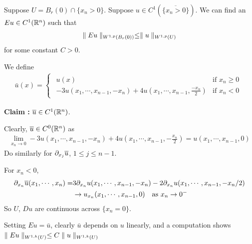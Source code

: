 \documentclass[10pt,a4paper]{report}
\newenvironment{proof}
{\begin{changemargin}{1cm}{0.5cm} 
	}%
	{\end{changemargin}
}
\newenvironment{subproof}
{\begin{changemargin}{0.5cm}{0.5cm} 
	}%
	{\end{changemargin}
}
\begin{document}
\lem Suppose $U = B_r(0) \cap \{x_n >0 \}$.  Suppose $u \in C^1( \overline{\{x_n>0 \}})$. We can find an $Eu \in C^1(\mathbb{R}^n)$ such that
\begin{align*}
\parallel Eu \parallel_{W^{1,p}(B_r(0))} \leq \parallel u \parallel_{W^{1,p}(U)}
\end{align*}
for some constant $C>0$.
\begin{proof}
\pf We define \begin{align*}
\bar{u}(x) = \begin{cases}
\begin{array}{lc}
u(x) & \text{if } x_n \geq 0 \\
-3u(x_1, \cdots, x_{n-1},-x_n) + 4u(x_1,\cdots, x_{n-1},\frac{-x_n}{2}) & \text{if } x_n<0
\end{array}
\end{cases}
\end{align*}
\begin{subproof}
\textbf{Claim :} $\overline{u} \in C^1(\mathbb{R}^n)$.

\quad Clearly, $\overline{u} \in C^0(\mathbb{R}^n)$ as
\begin{align*}
\lim_{x_n \rightarrow 0} -3u(x_1, \cdots,x_{n-1},-x_n) + 4u(x_1, \cdots, x_{n-1},-\frac{x_n}{2}) = u(x_1, \cdots, x_{n-1},0)
\end{align*}
Do similarly for $\partial_{x_j} \overline{u}$, $1\leq j\leq n-1$.

\quad For $x_n <0$,
\begin{align*}
\partial_{x_n} \overline{u}(x_1,\cdots, x_n) =& 3\partial_{x_n} u(x_1, \cdots, x_{n-1},-x_n) -2\partial_{x_n} u(x_1, \cdots, x_{n-1},-x_n/2)\\
& \rightarrow u_{x_n}(x_1, \cdots, x_{n-1},0) \quad \text{as } x_n \rightarrow 0^-
\end{align*}
So $U$, $Du$ are continuous across $\{x_n=0\}$. 
\end{subproof}
Setting $Eu = \bar{u}$, clearly $\bar{u}$ depends on $u$ linearly, and a computation shows $\parallel Eu \parallel_{W^{1,k}(U)} \leq C \parallel u \parallel_{W^{1,k}(U)}$

\eop
\end{proof}
\end{document}
